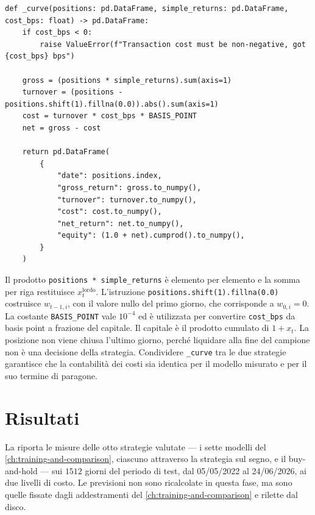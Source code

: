 \begin{listing}[H]
\begin{verbatim}
def _curve(positions: pd.DataFrame, simple_returns: pd.DataFrame, cost_bps: float) -> pd.DataFrame:
    if cost_bps < 0:
        raise ValueError(f"Transaction cost must be non-negative, got {cost_bps} bps")

    gross = (positions * simple_returns).sum(axis=1)
    turnover = (positions - positions.shift(1).fillna(0.0)).abs().sum(axis=1)
    cost = turnover * cost_bps * BASIS_POINT
    net = gross - cost

    return pd.DataFrame(
        {
            "date": positions.index,
            "gross_return": gross.to_numpy(),
            "turnover": turnover.to_numpy(),
            "cost": cost.to_numpy(),
            "net_return": net.to_numpy(),
            "equity": (1.0 + net).cumprod().to_numpy(),
        }
    )
\end{verbatim}
\caption{\texttt{\_curve}}
\label{lst:curve}
\end{listing}

Il prodotto \texttt{positions * simple\_returns} è elemento per elemento e la somma per riga restituisce $x_t^{\mathrm{lordo}}$. L'istruzione \texttt{positions.shift(1).fillna(0.0)} costruisce $w_{t-1,i}$, con il valore nullo del primo giorno, che corrisponde a $w_{0,i}=0$. La costante \texttt{BASIS\_POINT} vale $10^{-4}$ ed è utilizzata per convertire \texttt{cost\_bps} da basis point a frazione del capitale. Il capitale è il prodotto cumulato di $1+x_t$. La posizione non viene chiusa l'ultimo giorno, perché liquidare alla fine del campione non è una decisione della strategia. Condividere \texttt{\_curve} tra le due strategie garantisce che la contabilità dei costi sia identica per il modello misurato e per il suo termine di paragone.

\section{Risultati}
\label{sec:bt-results}

La  riporta le misure delle otto strategie valutate — i sette modelli del \cref{ch:training-and-comparison}, ciascuno attraverso la strategia sul segno, e il buy-and-hold — sui $1512$ giorni del periodo di test, dal 05/05/2022 al 24/06/2026, ai due livelli di costo. Le previsioni non sono ricalcolate in questa fase, ma sono quelle fissate dagli addestramenti del \cref{ch:training-and-comparison} e rilette dal disco.

